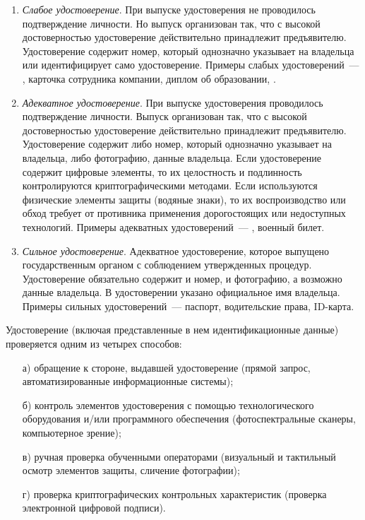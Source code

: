 \begin{enumerate}
\item
{\it Слабое удостоверение}. 
При выпуске удостоверения не проводилось подтверждение личности.
Но выпуск организован так, что с высокой достоверностью
удостоверение действительно принадлежит предъявителю. 
Удостоверение содержит номер, который однозначно указывает на владельца
или идентифицирует само удостоверение.
%
Примеры слабых удостоверений~--- 
,
карточка сотрудника компании,
диплом об образовании,
.


\item
{\it Адекватное удостоверение}. 
При выпуске удостоверения проводилось подтверждение личности.
Выпуск организован так, что с высокой достоверностью
удостоверение действительно принадлежит предъявителю. 
%
Удостоверение содержит либо номер, который однозначно указывает на 
владельца, либо фотографию,  данные владельца.
% 
Если удостоверение содержит цифровые элементы, то их целостность и 
подлинность контролируются криптографическими методами. 
%
Если используются физические элементы защиты (водяные знаки),  
то их воспроизводство или обход требует от противника применения 
дорогостоящих или недоступных технологий. 
%
Примеры адекватных удостоверений~--- ,
военный билет.

\item
{\it Сильное удостоверение}. 
Адекватное удостоверение, которое выпущено государственным органом с 
соблюдением утвержденных процедур. Удостоверение обязательно содержит 
и номер, и фотографию, а возможно  данные владельца.
В удостоверении указано официальное имя владельца.
%
Примеры сильных удостоверений~--- паспорт, водительские права, ID-карта.
\end{enumerate}

Удостоверение (включая представленные в нем идентификационные данные) 
проверяется одним из четырех способов:
\begin{enumerate}
\item[а)]
обращение к стороне, выдавшей удостоверение (прямой запрос, 
автоматизированные информационные системы);
%
%
\item[б)]
контроль элементов удостоверения с помощью технологического оборудования 
и/или программного обеспечения (фотоспектральные сканеры, компьютерное 
зрение);
%
%
\item[в)]
ручная проверка обученными операторами (визуальный и тактильный осмотр 
элементов защиты, сличение фотографии);
%

\item[г)]
проверка криптографических контрольных характеристик
(проверка электронной цифровой подписи).
%
%
\end{enumerate}

